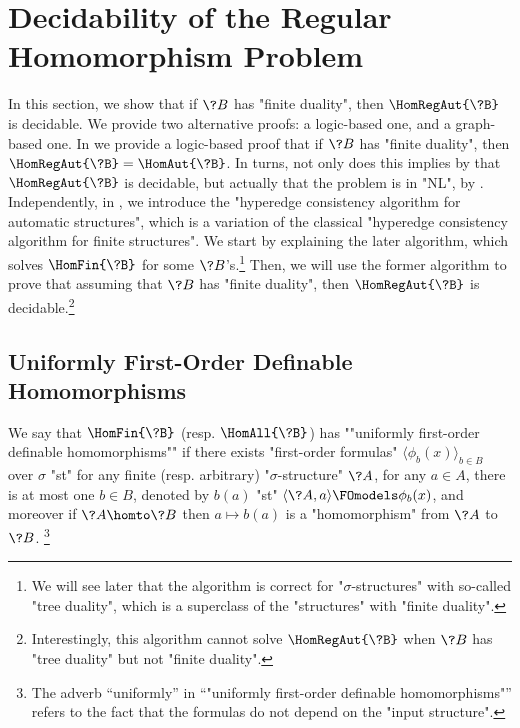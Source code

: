 \section{Decidability of the Regular Homomorphism Problem}
\label{sec:dichotomy-decidability}

In this section, we show that if $\?B$ has "finite duality", then $\HomRegAut{\?B}$ is decidable.
We provide two alternative proofs: a logic-based one, and a graph-based one.
In  we provide
a logic-based proof that if $\?B$ has "finite duality", then $\HomRegAut{\?B} = \HomAut{\?B}$.
In turns, not only does this implies by 
that $\HomRegAut{\?B}$ is decidable, but actually that the problem is in "NL",
by .
Independently, in ,
we introduce the "hyperedge consistency algorithm for automatic structures",
which is a variation of the classical "hyperedge consistency algorithm for finite structures".
We start by explaining the later algorithm,
which solves $\HomFin{\?B}$ for some $\?B$'s.\footnote{We will
see later that the algorithm is correct for "$\sigma$-structures" with so-called "tree duality",
which is a superclass of the "structures" with "finite duality".}
Then, we will use the former algorithm to prove that assuming that $\?B$ has "finite duality",
then $\HomRegAut{\?B}$ is decidable.\footnote{Interestingly, this algorithm cannot solve
$\HomRegAut{\?B}$ when $\?B$ has "tree duality" but not "finite duality".}

\subsection{Uniformly First-Order Definable Homomorphisms}
\label{sec:uniformly-first-order-definable-hom}

We say that $\HomFin{\?B}$ (resp. $\HomAll{\?B}$)
has \AP""uniformly first-order definable homomorphisms"" if there exists "first-order formulas"
$\langle \phi_b(x) \rangle_{b\in B}$ over $\sigma$ "st" for any finite
(resp. arbitrary) "$\sigma$-structure" $\?A$, for any $a\in A$,
there is at most one $b \in B$, denoted by $b(a)$
"st" $\langle \?A, a \rangle \FOmodels \phi_b(x)$, and moreover if $\?A \homto \?B$
then $a \mapsto b(a)$ is a "homomorphism" from $\?A$ to $\?B$.%
\footnote{The adverb ``uniformly'' in ``"uniformly first-order definable homomorphisms"''
refers to the fact that the formulas do not depend on the "input structure".}

